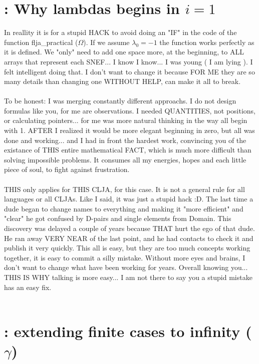 	
	\section{\:: Why lambdas begins in $i=1$}
	
		\noindent
		In reallity it is for a stupid HACK to avoid doing an "IF" in the code of the function flja\_practical ($\Omega$). If we assume $\lambda_{0}= -1$ the function works perfectly as it is defined. We "only" need to add one space more, at the beginning, to ALL arrays that represent each SNEF... I know I know... I was young ( I am lying ). I felt intelligent doing that. I don't want to change it because FOR ME they are so many details than changing one WITHOUT HELP, can make it all to break.
		\\\\
		
		\noindent
		To be honest: I was merging constantly different approachs. I do not design formulas like you, for me are observations. I needed QUANTITIES, not positions, or calculating pointers... for me was more natural thinking in the way all begin with 1. AFTER I realized it would be more elegant beginning in zero, but all was done and working... and I had in front the hardest work, convincing you of the existance of THIS entire mathematical FACT, which is much more difficult than solving impossible problems. It consumes all my energies, hopes and each little piece of soul, to fight against frustration.
		\\\\
		
		\noindent
		THIS only applies for THIS CLJA, for this case. It is not a general rule for all languages or all CLJAs. Like I said, it was just a stupid hack :D. The last time a dude began to change names to everything and making it "more efficient" and "clear" he got confused by D-pairs and single elements from Domain. This discovery was delayed a couple of years because THAT hurt the ego of that dude. He ran away VERY NEAR of the last point, and he had contacts to check it and publish it very quickly. This all is easy, but they are too much concepts working together, it is easy to commit a silly mistake. Without more eyes and brains, I don't want to change what have been working for years. Overall knowing you... THIS IS WHY talking is more easy... I am not there to say you a stupid mistake has an easy fix.
		\\\\
	
	
	\section{\:: extending finite cases to infinity ($\gamma$)}
	
